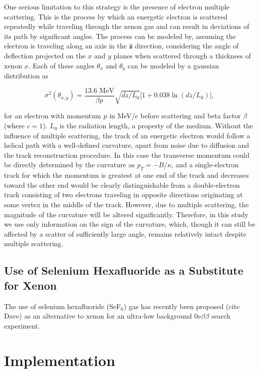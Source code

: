 \documentclass{JINST}
\begin{document}
One serious limitation to this strategy is the presence of electron multiple scattering.  This is the process by which
an energetic electron is scattered repeatedly while traveling through the xenon gas and can result in deviations of its
path by significant angles.  The process can be modeled by, assuming the electron is traveling along an axis in the $\hat{\mathbf{z}}$ direction, considering the angle of deflection projected on the $x$ and $y$ planes when scattered
through a thickness of xenon $x$.  Each of these angles $\theta_x$ and $\theta_y$ can be modeled by a gaussian 
distribution as

\begin{equation}\label{eqn_mscat}
\sigma^{2}(\theta_{x,y}) = \frac{13.6\,\,\mathrm{MeV}}{\beta p}\sqrt{dz/L_{0}}\bigl[1 + 0.038\ln(dz/L_{0})\bigr],
\end{equation}

\noindent for an electron with momentum $p$ in MeV/c before scattering and beta factor $\beta$ (where $c = 1$).
$L_{0}$ is the radiation length, a property of the medium.  Without the influence of multiple scattering, the track of
an energetic electron would follow a helical path with a well-defined curvature, apart from noise due to diffusion and
the track reconstruction procedure.  In this case the transverse momentum could be directly determined by the
curvature as $p_{T} = -B/\kappa$, and a single-electron track for which the momentum is greatest at one end of the
track and decreases toward the other end would be clearly distinguishable
from a double-electron track consisting of two electrons traveling in opposite directions originating at some vertex
in the middle of the track.  However, due to multiple scattering, the magnitude of the curvature will be altered
significantly.  Therefore, in this study we use only information on the sign of the curvature, which, though it can still
be affected by a scatter of sufficiently large angle, remains relatively intact despite multiple scattering.

\subsection{Use of Selenium Hexafluoride as a Substitute for Xenon}
The use of selenium hexafluoride (SeF$_6$) gas has recently been proposed (cite Dave) as an alternative to xenon for an 
ultra-low background $0\nu\beta\beta$ search experiment.

\section{Implementation}\label{sec:implementation}
\end{document}
